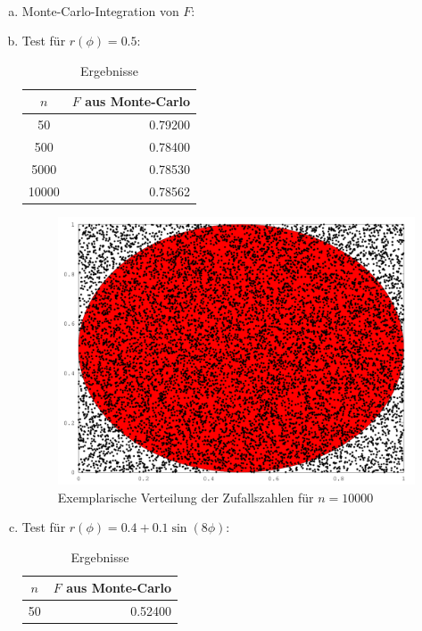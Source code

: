 \documentclass[a4paper]{scrartcl}
\begin{document}
\begin{aufgabe}~

	\begin{enumerate}[a)]
		\item
			Monte-Carlo-Integration von $F$:
			
		\newpage
		\item
			Test für $r(\phi)=0.5$:
			
			\begin{table}[h]
				\centering
				\caption{Ergebnisse}
				\begin{tabular}{c|r}
					$n$ & $F$ aus Monte-Carlo \\ \hline
					50 & 0.79200 \\
					500 & 0.78400 \\
					5000 & 0.78530 \\
					10000 & 0.78562
				\end{tabular}
			\end{table}
			\begin{figure}[h]
				\centering
				\caption{Exemplarische Verteilung der Zufallszahlen für $n=10000$}
				\includegraphics[scale=0.4]{num1_9_4/b.png}
			\end{figure}
		\newpage
		\item
			Test für $r(\phi)=0.4 + 0.1 \sin(8\phi)$:
			
			\begin{table}[h]
				\centering
				\caption{Ergebnisse}
				\begin{tabular}{c|r}
					$n$ & $F$ aus Monte-Carlo \\ \hline
					50 & 0.52400 \\

\end{tabular}
\end{table}
\end{enumerate}
\end{aufgabe}
\end{document}
